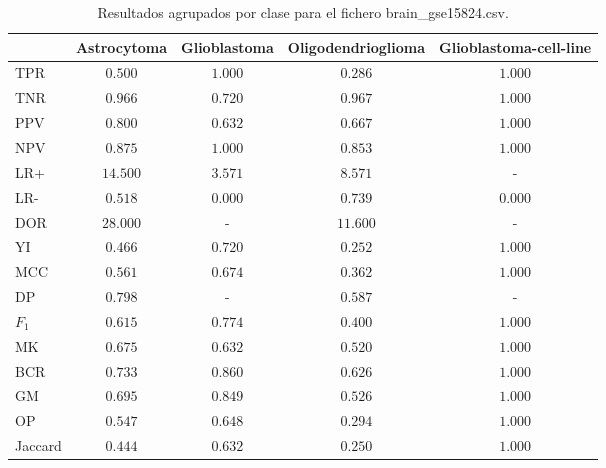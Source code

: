 \begin{table}[htp]
    \small
    \centering
    \begin{tabularx}{\columnwidth}{l c c c c}
                &  Astrocytoma  & Glioblastoma & Oligodendrioglioma   & Glioblastoma-cell-line   \\\hline
        TPR     &  $0.500$      & $1.000$      & $0.286$              & $1.000$                  \\\hline
        TNR     &  $0.966$      & $0.720$      & $0.967$              & $1.000$                  \\\hline
        PPV     &  $0.800$      & $0.632$      & $0.667$              & $1.000$                  \\\hline
        NPV     &  $0.875$      & $1.000$      & $0.853$              & $1.000$                  \\\hline
        LR+     &  $14.500$     & $3.571$      & $8.571$              & -                        \\\hline
        LR-     &  $0.518$      & $0.000$      & $0.739$              & $0.000$                  \\\hline
        DOR     &  $28.000$     & -            & $11.600$             & -                        \\\hline
        YI      &  $0.466$      & $0.720$      & $0.252$              & $1.000$                  \\\hline
        MCC     &  $0.561$      & $0.674$      & $0.362$              & $1.000$                  \\\hline
        DP      &  $0.798$      & -            & $0.587$              & -                        \\\hline
        $F_{1}$ &  $0.615$      & $0.774$      & $0.400$              & $1.000$                  \\\hline
        MK      &  $0.675$      & $0.632$      & $0.520$              & $1.000$                  \\\hline
        BCR     &  $0.733$      & $0.860$      & $0.626$              & $1.000$                  \\\hline
        GM      &  $0.695$      & $0.849$      & $0.526$              & $1.000$                  \\\hline
        OP      &  $0.547$      & $0.648$      & $0.294$              & $1.000$                  \\\hline
        Jaccard &  $0.444$      & $0.632$      & $0.250$              & $1.000$                  \\\hline

    \end{tabularx}
    \caption{Resultados agrupados por clase para el fichero brain\_gse15824.csv.}
    \label{tab:11}
\end{table}

